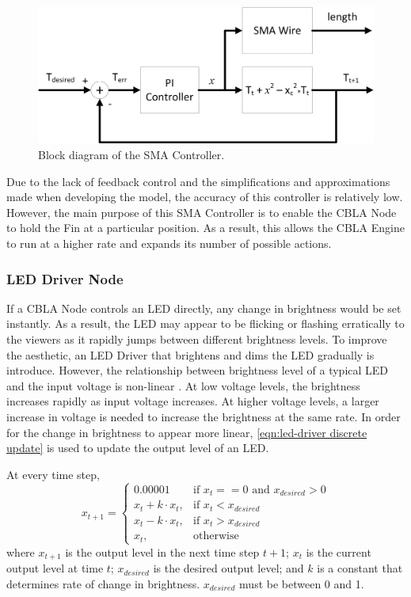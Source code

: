 \begin{figure} [htb]
	\centering
	\includegraphics[width=1.0\textwidth]{"fig/validations/SMA Controller"}
	\caption[Block diagram of the SMA Controller]{Block diagram of the SMA Controller. }
	\label{fig:SMA Controller}
\end{figure}

Due to the lack of feedback control and the simplifications and approximations made when developing the model, the accuracy of this controller is relatively low. However, the main purpose of this SMA Controller is to enable the CBLA Node to hold the Fin at a particular position. As a result, this allows the CBLA Engine to run at a higher rate and expands its number of possible actions. 


\subsubsection{LED Driver Node}

If a CBLA Node controls an LED directly, any change in brightness would be set instantly. As a result, the LED may appear to be flicking or flashing erratically to the viewers as it rapidly jumps between different brightness levels. To improve the aesthetic, an LED Driver that brightens and dims the LED gradually is introduce. However, the relationship between brightness level of a typical LED and the input voltage is non-linear \cite{CreeLEDDatasheet}. At low voltage levels, the brightness increases rapidly as input voltage increases. At higher voltage levels, a larger increase in voltage is needed to increase the brightness at the same rate. In order for the change in brightness to appear more linear, \eqref{eqn:led-driver discrete update} is used to update the output level of an LED. 

At every time step, 
\begin{equation}\label{eqn:led-driver discrete update}
	x_{t+1} =
	\begin{cases}
		0.00001 & \text{if } x_{t} == 0 \text{ and }  x_{desired} > 0 \\
		x_{t} + k \cdot x_{t}, & \text{if } x_{t} < x_{desired} \\
		x_{t} - k \cdot x_{t}, & \text{if } x_{t} > x_{desired} \\
		x_{t}, & \text{otherwise}
	\end{cases} 
\end{equation}
where $x_{t+1}$ is the output level in the next time step $t+1$; $x_t$ is the current output level at time $t$; $x_{desired}$ is the desired output level; and $k$ is a constant that determines rate of change in brightness. $x_{desired}$ must be between 0 and 1. 

